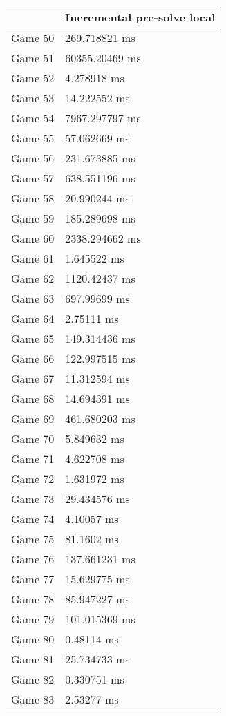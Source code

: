 \begin{tabular}{|l|l|}
	\hline
	& Incremental pre-solve local \\ \hline
	Game 50 & 269.718821 ms \\ \hline
	Game 51 & 60355.20469 ms \\ \hline
	Game 52 & 4.278918 ms \\ \hline
	Game 53 & 14.222552 ms \\ \hline
	Game 54 & 7967.297797 ms \\ \hline
	Game 55 & 57.062669 ms \\ \hline
	Game 56 & 231.673885 ms \\ \hline
	Game 57 & 638.551196 ms \\ \hline
	Game 58 & 20.990244 ms \\ \hline
	Game 59 & 185.289698 ms \\ \hline
	Game 60 & 2338.294662 ms \\ \hline
	Game 61 & 1.645522 ms \\ \hline
	Game 62 & 1120.42437 ms \\ \hline
	Game 63 & 697.99699 ms \\ \hline
	Game 64 & 2.75111 ms \\ \hline
	Game 65 & 149.314436 ms \\ \hline
	Game 66 & 122.997515 ms \\ \hline
	Game 67 & 11.312594 ms \\ \hline
	Game 68 & 14.694391 ms \\ \hline
	Game 69 & 461.680203 ms \\ \hline
	Game 70 & 5.849632 ms \\ \hline
	Game 71 & 4.622708 ms \\ \hline
	Game 72 & 1.631972 ms \\ \hline
	Game 73 & 29.434576 ms \\ \hline
	Game 74 & 4.10057 ms \\ \hline
	Game 75 & 81.1602 ms \\ \hline
	Game 76 & 137.661231 ms \\ \hline
	Game 77 & 15.629775 ms \\ \hline
	Game 78 & 85.947227 ms \\ \hline
	Game 79 & 101.015369 ms \\ \hline
	Game 80 & 0.48114 ms \\ \hline
	Game 81 & 25.734733 ms \\ \hline
	Game 82 & 0.330751 ms \\ \hline
	Game 83 & 2.53277 ms \\ \hline

\end{tabular}
